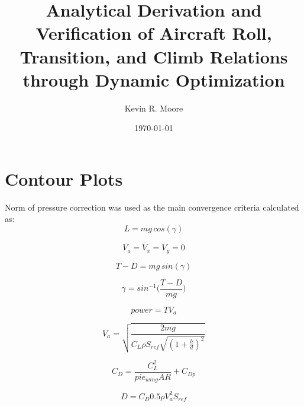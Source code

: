 \documentclass[10pt,english]{article}
\title{\vspace{-20pt}Analytical Derivation and Verification of Aircraft Roll, Transition, and Climb Relations through Dynamic Optimization }
\author{Kevin R. Moore}
\affil{\vspace{-10pt}Brigham Young University}
\date{\today}
\begin{document}
\maketitle

\section{Contour Plots}
%



\noindent Norm of pressure correction was used as the main convergence criteria calculated as:
    \begin{equation}
      L = m g \, cos(\gamma)
    \end{equation}

    \begin{equation}    
     \dot{V_a} =\dot{V_x} = \dot{V_y} = 0
    \end{equation}
    
        \begin{equation}    
     T-D = m g \, sin(\gamma)
    \end{equation}
    
           \begin{equation}    
     \gamma = sin^{-1}\Bigg(\frac{T-D}{mg}\Bigg)
    \end{equation}
    
               \begin{equation}    
     power = T V_a
    \end{equation}
    
    \begin{equation}    
    V_a = \sqrt{\frac{2 m g}{C_L \rho S_{ref} \sqrt{(1+\frac{h}{d})^2}}}
    \end{equation}
    
               \begin{equation}    
C_D = \frac{C_L^2}{pi e_{wing} AR} + C_{Dp}
    \end{equation}
    
               \begin{equation}    
         D = C_D 0.5 \rho V_a^2 S_{ref}
    \end{equation}
    
\end{document}
